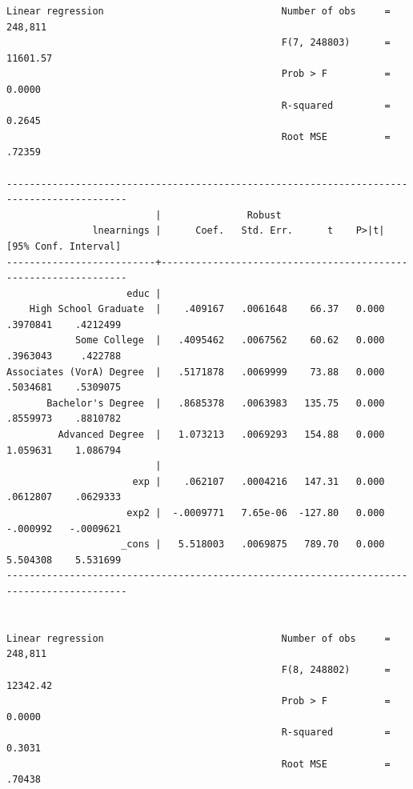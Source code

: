\documentclass[
]{book}
\begin{document}
\begin{verbatim}
Linear regression                               Number of obs     =    248,811
                                                F(7, 248803)      =   11601.57
                                                Prob > F          =     0.0000
                                                R-squared         =     0.2645
                                                Root MSE          =     .72359

-------------------------------------------------------------------------------------------
                          |               Robust
               lnearnings |      Coef.   Std. Err.      t    P>|t|     [95% Conf. Interval]
--------------------------+----------------------------------------------------------------
                     educ |
    High School Graduate  |    .409167   .0061648    66.37   0.000     .3970841    .4212499
            Some College  |   .4095462   .0067562    60.62   0.000     .3963043     .422788
Associates (VorA) Degree  |   .5171878   .0069999    73.88   0.000     .5034681    .5309075
       Bachelor's Degree  |   .8685378   .0063983   135.75   0.000     .8559973    .8810782
         Advanced Degree  |   1.073213   .0069293   154.88   0.000     1.059631    1.086794
                          |
                      exp |    .062107   .0004216   147.31   0.000     .0612807    .0629333
                     exp2 |  -.0009771   7.65e-06  -127.80   0.000     -.000992   -.0009621
                    _cons |   5.518003   .0069875   789.70   0.000     5.504308    5.531699
-------------------------------------------------------------------------------------------


Linear regression                               Number of obs     =    248,811
                                                F(8, 248802)      =   12342.42
                                                Prob > F          =     0.0000
                                                R-squared         =     0.3031
                                                Root MSE          =     .70438


\end{verbatim}
\end{document}
